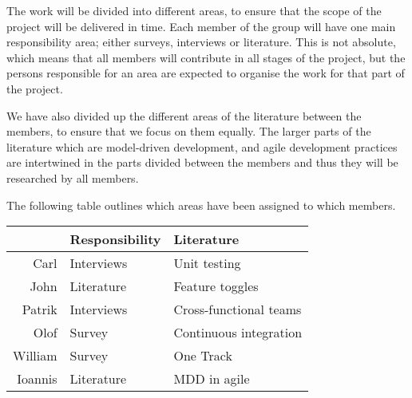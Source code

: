 \documentclass[ProjectPlan_innit.tex]{subfiles}
\begin{document}
The work will be divided into different areas, to ensure that the scope of the project will be delivered in time. Each member of the group will have one main responsibility area; either surveys, interviews or literature. This is not absolute, which means that all members will contribute in all stages of the project, but the persons responsible for an area are expected to organise the work for that part of the project. 
\smallskip


We have also divided up the different areas of the literature between the members, to ensure that we focus on them equally. The larger parts of the literature which are model-driven development, and agile development practices are intertwined in the parts divided between the members and thus they will be researched by all members.  
\smallskip

The following table outlines which areas have been assigned to which members. 

\begin{table}[h]
	\centering
	\begin{tabular} { r | l | l }

		& \textbf{Responsibility}	& \textbf{Literature} \\ \hline
		Carl 	& Interviews		& Unit testing \\ \hline
		John 	& Literature		& Feature toggles \\ \hline
		Patrik 	& Interviews		& Cross-functional teams \\ \hline
		Olof	& Survey			& Continuous integration \\ \hline
		William	& Survey			& One Track \\ \hline
		Ioannis	& Literature		& MDD in agile \\

	\end{tabular}
\end{table}
\end{document}
